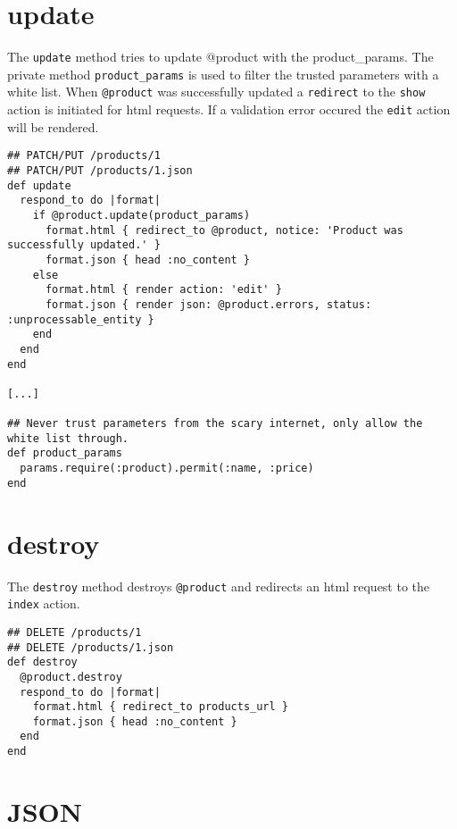 \documentclass[a4paper]{book}
\begin{document}
\section{update}\label{update}

The \texttt{update} method tries to update @product with the product\_params. The private method \texttt{product\_params} is used to filter the trusted parameters with a white list. When \texttt{@product} was successfully updated a \texttt{redirect} to the \texttt{show} action is initiated for html requests. If a validation error occured the \texttt{edit} action will be rendered.

\begin{shaded}\begin{verbatim}
## PATCH/PUT /products/1
## PATCH/PUT /products/1.json
def update
  respond_to do |format|
    if @product.update(product_params)
      format.html { redirect_to @product, notice: 'Product was successfully updated.' }
      format.json { head :no_content }
    else
      format.html { render action: 'edit' }
      format.json { render json: @product.errors, status: :unprocessable_entity }
    end
  end
end

[...]

## Never trust parameters from the scary internet, only allow the white list through.
def product_params
  params.require(:product).permit(:name, :price)
end
\end{verbatim}\end{shaded}

\section{destroy}\label{destroy-1}

The \texttt{destroy} method destroys \texttt{@product} and redirects an html request to the \texttt{index} action.

\begin{shaded}\begin{verbatim}
## DELETE /products/1
## DELETE /products/1.json
def destroy
  @product.destroy
  respond_to do |format|
    format.html { redirect_to products_url }
    format.json { head :no_content }
  end
end
\end{verbatim}\end{shaded}

\section{JSON}\label{json}
\end{document}
